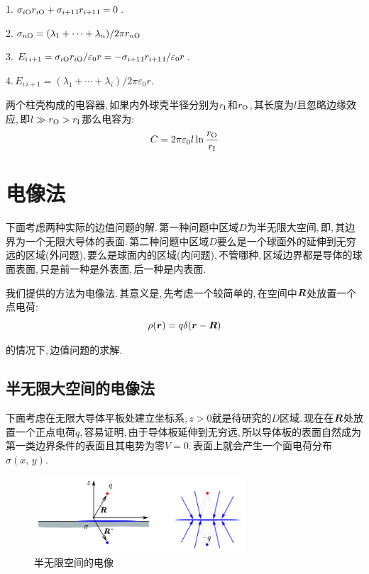 1.\,$\sigma_{i{\rm O}} r_{i{\rm O}}+\sigma_{i+1\,{\rm I}}r_{i+1\,{\rm I}}=0$.

2.\,$\sigma_{n{\rm O}}=(\lambda_1+\cdots+\lambda_n)/2\pi r_{n{\rm O}}$

3.\,$E_{i\,i+1}=\sigma_{i{\rm O}}r_{i{\rm O}} /\varepsilon_0r=-\sigma_{i+1\,{\rm I}}r_{i+1\,{\rm I}}/\varepsilon_0r$.

4.\,$E_{i\,i+1}=(\lambda_1+\cdots+\lambda_i)/2\pi\varepsilon_0 r$.

两个柱壳构成的电容器,\,如果内外球壳半径分别为$r_{\rm I}$和$r_{\rm O}$,\,其长度为$l$且忽略边缘效应,\,即$l\gg r_{\rm O}>r_{\rm I}$那么电容为:
\[C=2\pi\varepsilon_0l\ln\frac{r_{\rm O}}{r_{\rm I}}\]

\section{电像法}

下面考虑两种实际的边值问题的解.\,第一种问题中区域$D$为半无限大空间,\,即,\,其边界为一个无限大导体的表面.\,第二种问题中区域$D$要么是一个球面外的延伸到无穷远的区域(外问题),\,要么是球面内的区域(内问题),\,不管哪种,\,区域边界都是导体的球面表面,\,只是前一种是外表面,\,后一种是内表面.

我们提供的方法为电像法.\,其意义是,\,先考虑一个较简单的,\,在空间中$\boldsymbol{R}$处放置一个点电荷:
\[\rho(\boldsymbol{r})=q\delta(\boldsymbol{r}-\boldsymbol{R})\]

的情况下,\,边值问题的求解.

\subsection{半无限大空间的电像法}

下面考虑在无限大导体平板处建立坐标系,\,$z>0$就是待研究的$D$区域.\,现在在$\boldsymbol{R}$处放置一个正点电荷$q$,\,容易证明,\,由于导体板延伸到无穷远,\,所以导体板的表面自然成为第一类边界条件的表面且其电势为零$V=0$.\,表面上就会产生一个面电荷分布$\sigma(x,\,y)$.
\begin{figure}[H]
\centering
\includegraphics[width=0.7\textwidth]{image/7-2-9.png}
\caption{半无限空间的电像}
\end{figure}

